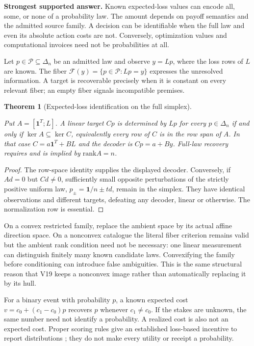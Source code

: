 \documentclass{article}
\newtheorem{theorem}{Theorem}
\theoremstyle{definition}
\begin{document}
\textbf{Strongest supported answer.} Known expected-loss values can
encode all, some, or none of a probability law. The amount depends on
payoff semantics and the admitted source family. A decision can be
identifiable when the full law and even its absolute action costs are
not. Conversely, optimization values and computational invoices need not
be probabilities at all.

Let \(p\in\mathcal P\subseteq\Delta_n\) be an admitted law and observe
\(y=Lp\), where the loss rows of \(L\) are known. The fiber
\(\mathcal F(y)=\{p\in\mathcal P:Lp=y\}\) expresses the unresolved
information. A target is recoverable precisely when it is constant on
every relevant fiber; an empty fiber signals incompatible premises.

\begin{theorem}[Expected-loss identification on the full simplex]\label{thm-identification}

Put \(A=[\mathbf1^T;L]\). A linear target \(Cp\) is determined by \(Lp\)
for every \(p\in\Delta_n\) if and only if \(\ker A\subseteq\ker C\),
equivalently every row of \(C\) is in the row span of \(A\). In that
case \(C=a\mathbf1^T+BL\) and the decoder is \(Cp=a+By\). Full-law
recovery requires and is implied by \(\mathrm{rank}A=n\).

\end{theorem}

\begin{proof}

The row-space identity supplies the displayed decoder. Conversely, if
\(Ad=0\) but \(Cd\ne0\), sufficiently small opposite perturbations of
the strictly positive uniform law, \(p_\pm=\mathbf1/n\pm td\), remain in
the simplex. They have identical observations and different targets,
defeating any decoder, linear or otherwise. The normalization row is
essential.
\end{proof}

On a convex restricted family, replace the ambient space by its actual
affine direction space. On a nonconvex catalogue the literal fiber
criterion remains valid but the ambient rank condition need not be
necessary: one linear measurement can distinguish finitely many known
candidate laws. Convexifying the family before conditioning can
introduce false ambiguities. This is the same structural reason that V19
keeps a nonconvex image rather than automatically replacing it by its
hull.

For a binary event with probability \(p\), a known expected cost
\(v=c_0+(c_1-c_0)p\) recovers \(p\) whenever \(c_1\ne c_0\). If the
stakes are unknown, the same number need not identify a probability. A
realized cost is also not an expected cost. Proper scoring rules give an
established loss-based incentive to report distributions
\citep{scoring}; they do not make every utility or receipt a
probability.
\end{document}
